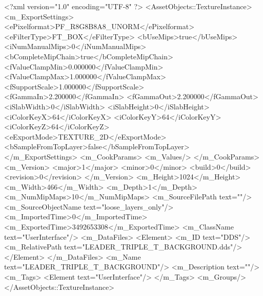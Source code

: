 <?xml version="1.0" encoding="UTF-8" ?>
<AssetObjects::TextureInstance>
	<m_ExportSettings>
		<ePixelformat>PF_R8G8B8A8_UNORM</ePixelformat>
		<eFilterType>FT_BOX</eFilterType>
		<bUseMips>true</bUseMips>
		<iNumManualMips>0</iNumManualMips>
		<bCompleteMipChain>true</bCompleteMipChain>
		<fValueClampMin>0.000000</fValueClampMin>
		<fValueClampMax>1.000000</fValueClampMax>
		<fSupportScale>1.000000</fSupportScale>
		<fGammaIn>2.200000</fGammaIn>
		<fGammaOut>2.200000</fGammaOut>
		<iSlabWidth>0</iSlabWidth>
		<iSlabHeight>0</iSlabHeight>
		<iColorKeyX>64</iColorKeyX>
		<iColorKeyY>64</iColorKeyY>
		<iColorKeyZ>64</iColorKeyZ>
		<eExportMode>TEXTURE_2D</eExportMode>
		<bSampleFromTopLayer>false</bSampleFromTopLayer>
	</m_ExportSettings>
	<m_CookParams>
		<m_Values/>
	</m_CookParams>
	<m_Version>
		<major>1</major>
		<minor>0</minor>
		<build>0</build>
		<revision>0</revision>
	</m_Version>
	<m_Height>1024</m_Height>
	<m_Width>466</m_Width>
	<m_Depth>1</m_Depth>
	<m_NumMipMaps>10</m_NumMipMaps>
	<m_SourceFilePath text=""/>
	<m_SourceObjectName text="loose_layers_only"/>
	<m_ImportedTime>0</m_ImportedTime>
	<m_ExportedTime>3492653308</m_ExportedTime>
	<m_ClassName text="UserInterface"/>
	<m_DataFiles>
		<Element>
			<m_ID text="DDS"/>
			<m_RelativePath text="LEADER_TRIPLE_T_BACKGROUND.dds"/>
		</Element>
	</m_DataFiles>
	<m_Name text="LEADER_TRIPLE_T_BACKGROUND"/>
	<m_Description text=""/>
	<m_Tags>
		<Element text="UserInterface"/>
	</m_Tags>
	<m_Groups/>
</AssetObjects::TextureInstance>

